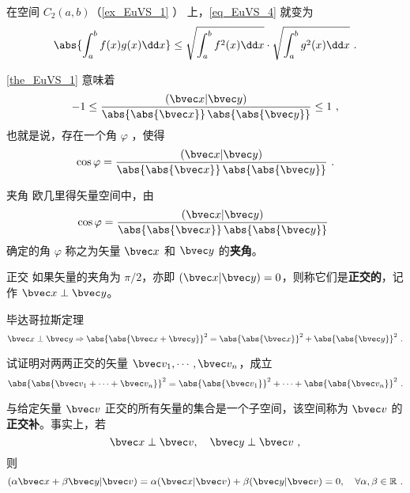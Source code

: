 \begin{example}{}
在空间 $C_2(a,b)$（\autoref{ex_EuVS_1} ） 上，\autoref{eq_EuVS_4} 就变为
\begin{equation}
\abs{\int_a^b f(x)g(x)\dd x}\leq\sqrt{\int_a^b f^2(x)\dd x}\cdot\sqrt{\int_a^b g^2(x)\dd x}~.
\end{equation}
\end{example}
\autoref{the_EuVS_1} 意味着
\begin{equation}
-1\leq\frac{(\bvec x|\bvec y)}{\abs{\abs{\bvec x}}\,\abs{\abs{\bvec y}}}\leq1~,
\end{equation}
也就是说，存在一个角 $\varphi$ ，使得
\begin{equation}
\cos\varphi=\frac{(\bvec x|\bvec y)}{\abs{\abs{\bvec x}}\,\abs{\abs{\bvec y}}}~.
\end{equation}
\begin{definition}{夹角}\label{def_EuVS_3}
欧几里得矢量空间中，由
\begin{equation}
\cos\varphi=\frac{(\bvec x|\bvec y)}{\abs{\abs{\bvec x}}\,\abs{\abs{\bvec y}}}~
\end{equation}
确定的角 $\varphi$ 称之为矢量 $\bvec x$ 和 $\bvec y$ 的\textbf{夹角}。 
\end{definition}
\begin{definition}{正交}
如果矢量的夹角为 $\pi/2$，亦即 $(\bvec x|\bvec y)=0$，则称它们是\textbf{正交的}，记作 $\bvec x\perp\bvec y$。
\end{definition}
\begin{theorem}{毕达哥拉斯定理}
\begin{equation}
\bvec x\perp\bvec y\Rightarrow\abs{\abs{\bvec x+\bvec y}}^2=\abs{\abs{\bvec x}}^2+\abs{\abs{\bvec y}}^2~.
\end{equation}
\end{theorem}
\begin{exercise}{}
试证明对两两正交的矢量 $\bvec v_1,\cdots,\bvec v_n$，成立
\begin{equation}\label{eq_EuVS_5}
\abs{\abs{\bvec v_1+\cdots+\bvec v_n}}^2=\abs{\abs{\bvec v_1}}^2+\cdots+\abs{\abs{\bvec v_n}}^2~.
\end{equation}
\end{exercise}
\begin{example}{}
与给定矢量 $\bvec v$ 正交的所有矢量的集合是一个子空间，该空间称为 $\bvec v$ 的\textbf{正交补}。事实上，若
\begin{equation}
\bvec x\perp\bvec v,\quad\bvec y\perp\bvec v~,
\end{equation}
则
\begin{equation}
(\alpha\bvec x+\beta\bvec y|\bvec v)=\alpha(\bvec x|\bvec v)+\beta(\bvec y|\bvec v)=0,\quad \forall\alpha,\beta\in\mathbb R~.
\end{equation}
\end{example}

